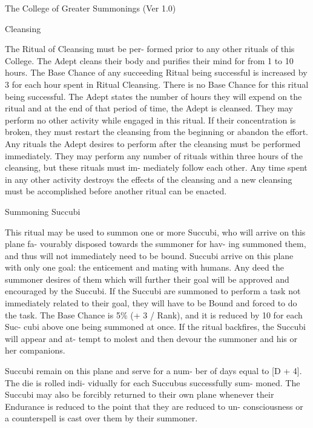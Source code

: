 \begin{Chapter}{The College of Greater Summonings (Ver 1.0)}
\begin{ritual}[Q-1]{Cleansing }
\begin{effects}
 The  Ritual  of  Cleansing  must  be  per-
formed  prior  to  any  other  rituals  of  this  College. 
The  Adept  cleans  their  body  and  purifies  their 
mind  for  from 1  to 10  hours.  The  Base  Chance  of 
any succeeding Ritual being successful is increased 
by 3 for each hour spent in Ritual Cleansing. There 
is  no  Base  Chance  for  this  ritual  being  successful. 
The  Adept  states  the  number  of  hours  they  will 
expend on the ritual and at the end of that period of 
time, the Adept is cleansed. They may perform no 
other  activity  while  engaged  in  this  ritual.  If  their 
concentration  is  broken,  they  must  restart  the 
cleansing from the beginning or abandon the effort. 
Any  rituals  the  Adept  desires  to  perform  after  the 
cleansing  must  be  performed  immediately.  They 
may  perform  any  number  of  rituals  within  three 
hours  of  the  cleansing,  but  these  rituals  must  im-
mediately follow each other. Any time spent in any 
other  activity  destroys  the  effects  of  the  cleansing 
and  a new  cleansing  must be  accomplished  before 
another ritual can be enacted. 

\end{effects}
\end{ritual}

\begin{ritual}[Q-2]{Summoning Succubi }

\begin{effects}
This ritual may be used to summon one or 
more  Succubi,  who  will  arrive  on  this  plane  fa-
vourably  disposed  towards  the  summoner  for  hav-
ing summoned them, and thus will not immediately 
need to be bound. Succubi arrive on this plane with 
only  one  goal:  the  enticement  and  mating  with 
humans.  Any  deed  the  summoner  desires  of  them 
which  will  further  their  goal  will  be  approved  and 
encouraged  by  the  Succubi.  If  the  Succubi  are 
summoned  to  perform  a  task  not  immediately 
related  to  their  goal,  they  will  have  to  be  Bound 
and forced to do the task. The Base Chance is 5\% 
(+ 3 / Rank), and it is reduced by 10 for each Suc-
cubi  above  one  being  summoned  at  once.  If  the 
ritual  backfires,  the  Succubi  will  appear  and  at-
tempt to molest and then devour the summoner and 
his or her companions. 

Succubi remain on this plane and serve for a num-
ber of days equal to [D + 4]. The die is rolled indi-
vidually  for  each  Succubus  successfully  sum-
moned. The Succubi may also be forcibly returned 
to  their  own  plane  whenever  their  Endurance  is 
reduced  to  the  point  that  they  are  reduced  to  un-
consciousness  or  a  counterspell  is  cast  over  them 
by their summoner. 


\end{effects}
\end{ritual}
\end{Chapter}
